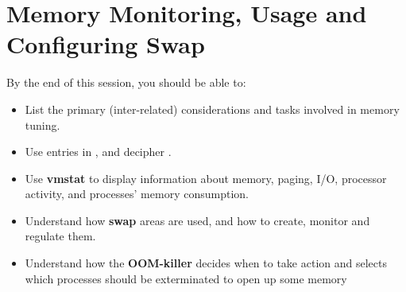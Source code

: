 \chapter{Memory Monitoring,  Usage and Configuring Swap}

\lflogo
\minitoc

\begin{lfbox}

   By the end of this session, you should be able to:

   \begin{itemize}
      \item
      List the primary (inter-related) considerations and
      tasks involved in memory tuning.
      \item
      Use entries in , and decipher
      .
      \item
      Use \textbf{vmstat} to display information about memory,
      paging, I/O, processor activity, and processes' memory
      consumption.
      \item
      Understand how \textbf{swap} areas are used, and how
      to create, monitor and regulate them.
      \item
      Understand how the \textbf{OOM-killer} decides when to
      take action and selects which processes should be
      exterminated to open up some memory

   \end{itemize}

\end{lfbox}

\clearpage





